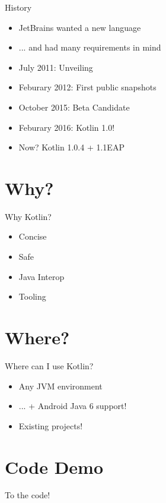 \documentclass{beamer}
\begin{document}
\begin{frame}{History}
\begin{itemize}
    \item JetBrains wanted a new language
    \item ... and had many requirements in mind
    \pause
    \item July 2011: Unveiling
    \item Feburary 2012: First public snapshots
    \item October 2015: Beta Candidate
    \item Feburary 2016: Kotlin 1.0!
    \item Now? \pause Kotlin 1.0.4 + 1.1EAP
\end{itemize}
\end{frame}

\section{Why?}

\begin{frame}{Why Kotlin?}
\begin{itemize}
    \item Concise \pause
    \item Safe \pause
    \item Java Interop \pause
    \item Tooling
\end{itemize}
\end{frame}

\section{Where?}

\begin{frame}{Where can I use Kotlin?}
\begin{itemize}
    \item Any JVM environment \pause
    \item ... + Android Java 6 support! \pause
    \item Existing projects!
\end{itemize}
\end{frame}

\section{Code Demo}
\begin{frame}{To the code!}
\end{frame}
\end{document}
